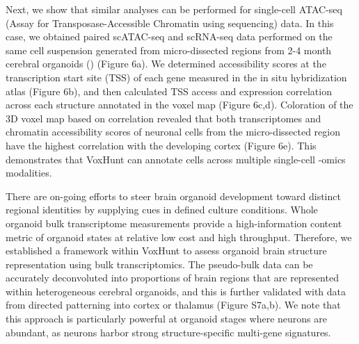 Next, we show that similar analyses can be performed for single-cell ATAC-seq (Assay for Transposase-Accessible Chromatin using sequencing) data. In this case, we obtained paired scATAC-seq and scRNA-seq data performed on the same cell suspension generated from micro-dissected regions from 2-4 month cerebral organoids (\cite{kanton_organoid_2019}) (Figure 6a). We determined accessibility scores at the transcription start site (TSS) of each gene measured in the in situ hybridization atlas (Figure 6b), and then calculated TSS access and expression correlation across each structure annotated in the voxel map (Figure 6c,d). Coloration of the 3D voxel map based on correlation revealed that both transcriptomes and chromatin accessibility scores of neuronal cells from the micro-dissected region have the highest correlation with the developing cortex (Figure 6e). This demonstrates that VoxHunt can annotate cells across multiple single-cell -omics modalities.

There are on-going efforts to steer brain organoid development toward distinct regional identities by supplying cues in defined culture conditions. Whole organoid bulk transcriptome measurements provide a high-information content metric of organoid states at relative low cost and high throughput. Therefore, we established a framework within VoxHunt to assess organoid brain structure representation using bulk transcriptomics. The pseudo-bulk data can be accurately deconvoluted into proportions of brain regions that are represented within heterogeneous cerebral organoids, and this is further validated with data from directed patterning into cortex or thalamus (Figure S7a,b). We note that this approach is particularly powerful at organoid stages where neurons are abundant, as neurons harbor strong structure-specific multi-gene signatures.


